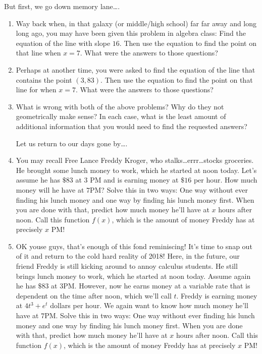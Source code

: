 \documentclass{ximera}
\begin{document}
But first, we go down memory lane….

\begin{exercise}
\begin{enumerate} 
\item Way back when, in that galaxy (or middle/high school) far far away and long long ago, you may have been given this problem in algebra class:  Find the equation of the line with slope $16$.  Then use the equation to find the point on that line when $x = 7$.  What were the answers to those questions?

\item Perhaps at another time, you were asked to find the equation of the line that contains the point $(3, 83)$.  Then use the equation to find the point on that line for when $x = 7$. What were the answers to those questions?
\item   What is wrong with both of the above problems?  Why do they not geometrically make sense?  In each case, what is the least amount of additional information that you would need to find the requested answers?  

     Let us return to our days gone by….

\item You may recall Free Lance Freddy Kroger, who stalks\dots errr\dots stocks groceries.  He brought some lunch money to work, which he started at noon today.  Let’s assume he has $\$83$ at $3$ PM and is earning money at $\$16$ per hour.  How much money will he have at $7$PM?  Solve this in two ways:  One way without ever finding his lunch money and one way by finding his lunch money first.  When you are done with that, predict how much money he'll have at $x$ hours after noon.  Call this function $f(x)$, which is the amount of money Freddy has at precisely $x$ PM!

\item OK youse guys, that's enough of this fond reminiscing!  It's time to snap out of it and return to the cold hard reality of 2018!  Here, in the future, our friend Freddy is still kicking around to annoy calculus students.  He still brings lunch money to work, which he started at noon today. Assume again he has $\$83$ at $3$PM.  However, now he earns money at a variable rate that is dependent on the time after noon, which we'll call $t$.  Freddy is earning money at  $4t^3+e^t$ dollars per hour.  We again want to know how much money he'll have at $7$PM.  Solve this in two ways: One way without ever finding his lunch money and one way by finding his lunch money first.  When you are done with that, predict how much money he'll have at $x$ hours after noon.  Call this function $f(x)$, which is the amount of money Freddy has at precisely $x$ PM!
\end{enumerate}
\end{exercise}
\end{document}
